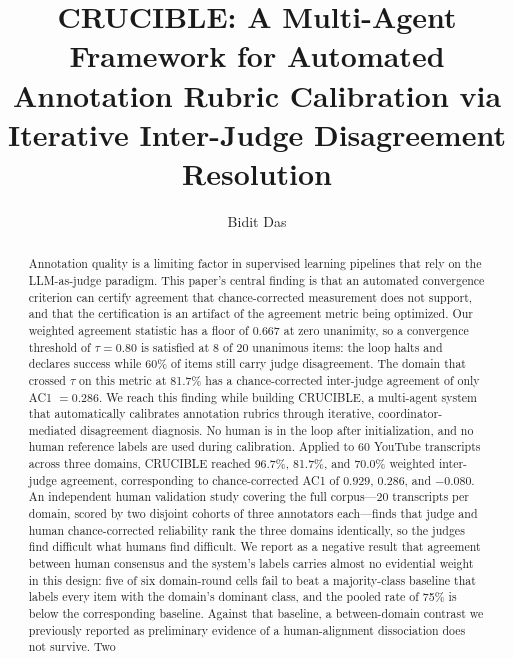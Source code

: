 \documentclass[letterpaper]{article}
\begin{document}
\title{CRUCIBLE: A Multi-Agent Framework for Automated Annotation Rubric
Calibration via Iterative Inter-Judge Disagreement Resolution}

\author{Bidit Das}

\maketitle

\begin{abstract}
Annotation quality is a limiting factor in supervised learning pipelines that
rely on the LLM-as-judge paradigm. This paper's central finding is that an
automated convergence criterion can certify agreement that chance-corrected
measurement does not support, and that the certification is an artifact of the
agreement metric being optimized. Our weighted agreement statistic has a floor
of $0.667$ at zero unanimity, so a convergence threshold of $\tau = 0.80$ is
satisfied at 8 of 20 unanimous items: the loop halts and declares success while
60\% of items still carry judge disagreement. The domain that crossed $\tau$ on
this metric at 81.7\% has a chance-corrected inter-judge agreement of only
AC1 $=0.286$. We reach this finding while building CRUCIBLE, a multi-agent
system that automatically calibrates annotation rubrics through iterative,
coordinator-mediated disagreement diagnosis. No human is in the loop after
initialization, and no human reference labels are used during calibration.
Applied to 60 YouTube transcripts across three domains, CRUCIBLE reached
96.7\%, 81.7\%, and 70.0\% weighted inter-judge agreement, corresponding to
chance-corrected AC1 of $0.929$, $0.286$, and $-0.080$. An independent human
validation study covering the full corpus---20 transcripts per domain, scored
by two disjoint cohorts of three annotators each---finds that judge and human
chance-corrected reliability rank the three domains identically, so the judges
find difficult what humans find difficult. We report as a negative result that
agreement between human consensus and the system's labels carries almost no
evidential weight in this design: five of six domain-round cells fail to beat a
majority-class baseline that labels every item with the domain's dominant
class, and the pooled rate of 75\% is below the corresponding baseline. Against that baseline, a between-domain contrast we previously reported as
preliminary evidence of a human-alignment dissociation does not survive. Two

\end{abstract}
\end{document}
